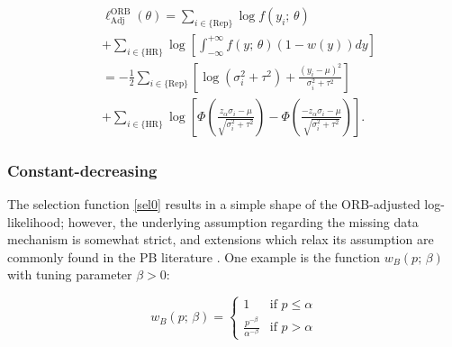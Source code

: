 \documentclass[twocolumn]{article}\usepackage[]{graphicx}\usepackage[]{xcolor}
\begin{document}
\begin{equation*}
\label{w.copas.der}
\begin{aligned}
& \ell_{\text{Adj}}^{\text{ORB}}(\theta) = \sum_{i \in \{\text{Rep} \} } \log f(y_i \text{; } \theta)\\
& + \sum_{i \in \{ \text{HR} \}} \log \left[\int_{-\infty}^{+\infty} f(y \text{; } \theta) (1-w(y)) dy\right] \\
& = -\frac{1}{2}\sum_{i \in \{\text{Rep} \}  }\left[\log(\sigma_{i}^2 + \tau^{2}) + \frac{(y_{i}-\mu)^2}{\sigma_{i}^2+\tau^2}\right]\\
& + \sum_{i \in \{\text{HR}\}} \log \left[\Phi\left(\frac{z_{\alpha} \sigma_i - \mu}{\sqrt{\sigma_{i}^2 + \tau^2}}\right)-\Phi\left(\frac{-z_{\alpha} \sigma_i-\mu}{\sqrt{\sigma_{i}^2 + \tau^2}}\right)\right] \text{.}
\end{aligned}
\end{equation*}

\bigskip

\subsubsection{Constant-decreasing}

The selection function \eqref{sel0} results in a simple shape of the ORB-adjusted log-likelihood; however, the underlying assumption regarding the missing data mechanism is somewhat strict, and extensions which relax its assumption are commonly found in the PB literature \citep{selection1, reviewselection}. One example is the function $w_B(p \text{; } \beta)$ with tuning parameter $\beta >0$:

\begin{equation}
w_B(p \text{; } \beta) = 
\begin{cases}
1 & \text{if } p \leq \alpha \\
\frac{p^{-\beta}}{\alpha^{-\beta}} & \text{if } p > \alpha
\end{cases}
\label{special1}
\end{equation}
\end{document}
